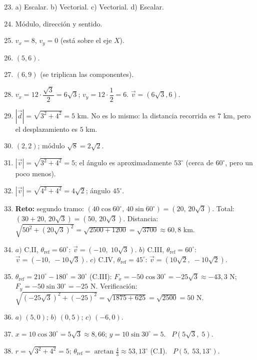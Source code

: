 \documentclass[12pt, letterpaper]{article}
\providecommand{\sen}{\sin}
\begin{document}
  \begin{enumerate}[leftmargin=*, label=\textbf{\arabic*.}]
    \setcounter{enumi}{22}
    \item a) Escalar. \quad b) Vectorial. \quad c) Vectorial. \quad d) Escalar.
    \item Módulo, dirección y sentido.
    \item $v_x = 8$, $v_y = 0$ (está sobre el eje $X$).
    \item $(5, 6)$.
    \item $(6, 9)$ (se triplican las componentes).
    \item $v_x = 12 \cdot \dfrac{\sqrt{3}}{2} = 6\sqrt{3}$; $v_y = 12 \cdot \dfrac{1}{2} = 6$. $\vec{v} = (6\sqrt{3}, 6)$.
    \item $|\vec{d}| = \sqrt{3^2 + 4^2} = 5$ km. No es lo mismo: la distancia recorrida es $7$ km, pero el desplazamiento es $5$ km.
    \item $(2, 2)$; módulo $\sqrt{8} = 2\sqrt{2}$.
    \item $|\vec{v}| = \sqrt{3^2 + 4^2} = 5$; el ángulo es aproximadamente $53^{\circ}$ (cerca de $60^{\circ}$, pero un poco menos).
    \item $|\vec{v}| = \sqrt{4^2 + 4^2} = 4\sqrt{2}$; ángulo $45^{\circ}$.
    \item \textbf{Reto:} segundo tramo: $(40\cos 60^{\circ},\, 40\sen 60^{\circ}) = (20,\, 20\sqrt{3})$. Total: $(30 + 20,\, 20\sqrt{3}) = (50,\, 20\sqrt{3})$. Distancia: $\sqrt{50^2 + (20\sqrt{3})^2} = \sqrt{2500 + 1200} = \sqrt{3700} \approx 60{,}8$ km.
    \item $a)$ C.II, $\theta_{\text{ref}} = 60^{\circ}$: $\vec{v} = (-10,\; 10\sqrt{3})$. \quad
          $b)$ C.III, $\theta_{\text{ref}} = 60^{\circ}$: $\vec{v} = (-10,\; -10\sqrt{3})$. \quad
          $c)$ C.IV, $\theta_{\text{ref}} = 45^{\circ}$: $\vec{v} = (10\sqrt{2},\; -10\sqrt{2})$.
    \item $\theta_{\text{ref}} = 210^{\circ} - 180^{\circ} = 30^{\circ}$ (C.III): $F_x = -50\cos 30^{\circ} = -25\sqrt{3} \approx -43{,}3$ N; $F_y = -50\sen 30^{\circ} = -25$ N. Verificación: $\sqrt{(-25\sqrt{3})^2 + (-25)^2} = \sqrt{1875 + 625} = \sqrt{2500} = 50$ N. \checkmark
    \item $a)$ $(5, 0)$; \quad $b)$ $(0, 5)$; \quad $c)$ $(-6, 0)$.
    \item $x = 10\cos 30^{\circ} = 5\sqrt{3} \approx 8{,}66$; $y = 10\sen 30^{\circ} = 5$. \ $P(5\sqrt{3},\; 5)$.
    \item $r = \sqrt{3^2 + 4^2} = 5$; $\theta_{\text{ref}} = \arctan\frac{4}{3} \approx 53{,}13^{\circ}$ (C.I). \ $P(5,\; 53{,}13^{\circ})$.

\end{enumerate}
\end{document}
